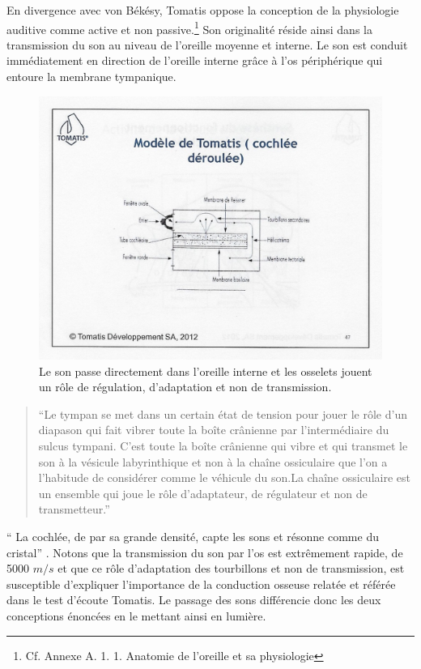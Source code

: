 En divergence avec von Békésy, Tomatis oppose la conception de la
physiologie auditive comme active et non
passive.\footnote{Cf. Annexe A. 1. 1. Anatomie de l'oreille et sa physiologie}
Son originalité réside ainsi dans la transmission du son
au niveau de l'oreille moyenne et interne. Le son est conduit immédiatement en direction de l'oreille 
interne grâce à l'os périphérique qui entoure la membrane tympanique.
\begin{figure}
	\centering
	\includegraphics[width=0.7\linewidth]{images/Cochleederoule_haut.jpg}
	\caption[Cochlée selon Tomatis]{Le son passe directement  
		dans l'oreille interne et les osselets jouent un rôle de régulation, d'adaptation et non de 
		transmission.}
	\label{fig:cochleederoulehaut}
\end{figure}
\begin{quotation}
	``Le tympan se met dans un certain état de tension pour jouer le
	rôle d'un diapason qui fait vibrer toute la boîte crânienne
	par l'intermédiaire du sulcus tympani.
	C'est toute la boîte crânienne qui vibre et qui transmet le son à
		la vésicule labyrinthique et non à la chaîne ossiculaire que l'on a l'habitude
		de considérer comme le véhicule du son.La chaîne ossiculaire est un ensemble
	qui
	joue le rôle d'adaptateur, de régulateur et non de transmetteur.'' \autocite {tomatis_conf1972}
\end{quotation}
\enquote {	La cochlée, de par sa grande densité, capte les sons
	et résonne comme du cristal}  \autocite {tomatis_conf1972}.
Notons que la transmission du son par l'os est extrêmement rapide, de
5000 $m/s$ et que ce rôle d'adaptation des tourbillons et non de transmission, 
est susceptible d'expliquer l'importance de  
la conduction osseuse relatée et référée dans le  test d'écoute Tomatis.
Le passage des sons différencie donc les deux conceptions énoncées 
en le mettant ainsi en lumière. 

